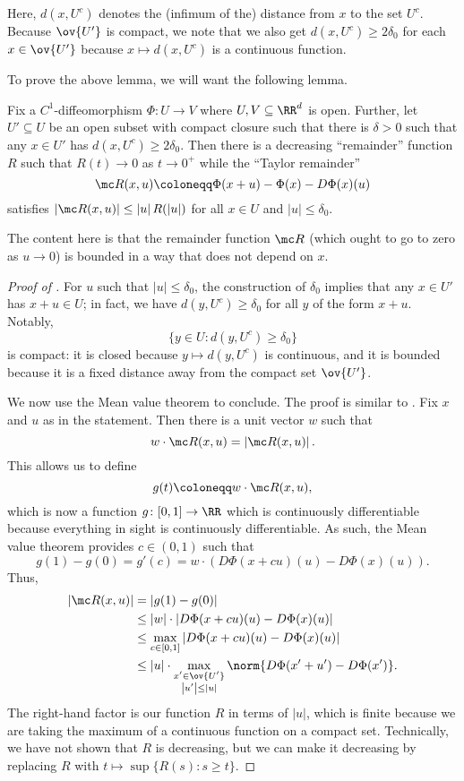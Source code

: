 \documentclass[../notes.tex]{subfiles}
\begin{document}
\begin{remark}
	Here, $d(x,U^c)$ denotes the (infimum of the) distance from $x$ to the set $U^c$. Because $\ov{U'}$ is compact, we note that we also get $d(x,U^c)\ge2\delta_0$ for each $x\in\ov{U'}$ because $x\mapsto d(x,U^c)$ is a continuous function.
\end{remark}
To prove the above lemma, we will want the following lemma.
\begin{lemma} \label{lem:uniform-c1}
	Fix a $C^1$-diffeomorphism $\Phi\colon U\to V$ where $U,V\subseteq\RR^d$ is open. Further, let $U'\subseteq U$ be an open subset with compact closure such that there is $\delta>0$ such that any $x\in U'$ has $d(x,U^c)\ge2\delta_0$. Then there is a decreasing ``remainder'' function $R$ such that $R(t)\to0$ as $t\to0^+$ while the ``Taylor remainder''
	\[\mc R(x,u)\coloneqq\Phi(x+u)-\Phi(x)-D\Phi(x)(u)\]
	satisfies $\left|\mc R(x,u)\right|\le\left|u\right|R(\left|u\right|)$ for all $x\in U$ and $\left|u\right|\le\delta_0$.
\end{lemma}
The content here is that the remainder function $\mc R$ (which ought to go to zero as $u\to0$) is bounded in a way that does not depend on $x$.
\begin{proof}[Proof of ]
	For $u$ such that $\left|u\right|\le\delta_0$, the construction of $\delta_0$ implies that any $x\in U'$ has $x+u\in U$; in fact, we have $d(y,U^c)\ge\delta_0$ for all $y$ of the form $x+u$. Notably,
	\[\{y\in U:d(y,U^c)\ge\delta_0\}\]
	is compact: it is closed because $y\mapsto d(y,U^c)$ is continuous, and it is bounded because it is a fixed distance away from the compact set $\ov{U'}$.

	We now use the Mean value theorem to conclude. The proof is similar to . Fix $x$ and $u$ as in the statement. Then there is a unit vector $w$ such that
	\[w\cdot\mc R(x,u)=\left|\mc R(x,u)\right|.\]
	This allows us to define
	\[g(t)\coloneqq w\cdot\mc R(x,u),\]
	which is now a function $g\colon[0,1]\to\RR$ which is continuously differentiable because everything in sight is continuously differentiable. As such, the Mean value theorem provides $c\in(0,1)$ such that
	\[g(1)-g(0)=g'(c)=w\cdot(D\Phi(x+cu)(u)-D\Phi(x)(u)).\]
	Thus,
	\begin{align*}
		\left|\mc R(x,u)\right| &= \left|g(1)-g(0)\right| \\
		&\le \left|w\right|\cdot\left|D\Phi(x+cu)(u)-D\Phi(x)(u)\right| \\
		&\le \max_{c\in[0,1]}\left|D\Phi(x+cu)(u)-D\Phi(x)(u)\right| \\
		&\le \left|u\right|\cdot\max_{\substack{x'\in\ov{U'}\\\left|u'\right|\le\left|u\right|}}\norm{D\Phi(x'+u')-D\Phi(x')}.
	\end{align*}
	The right-hand factor is our function $R$ in terms of $\left|u\right|$, which is finite because we are taking the maximum of a continuous function on a compact set. Technically, we have not shown that $R$ is decreasing, but we can make it decreasing by replacing $R$ with $t\mapsto\sup\{R(s):s\ge t\}$.
\end{proof}
\end{document}
